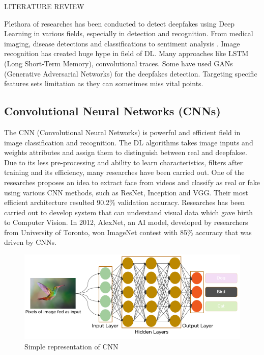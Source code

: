 \begin{section}[]{\uppercase{Literature Review}}

 Plethora of researches has been conducted to detect deepfakes using Deep Learning in various fields, especially in detection and recognition. From medical imaging, disease detections and classifications \cite{Khan2021} to sentiment analysis \cite{Alam2021}.
 Image recognition has created huge hype in field of DL. Many approaches like LSTM (Long Short-Term Memory), convolutional traces. Some have used GANs (Generative Adversarial Networks) for the deepfakes detection. \cite{Guarnera2020}
 Targeting specific features sets limitation as they can sometimes miss vital points.

 \subsection{Convolutional Neural Networks (CNNs)}
 The CNN (Convolutional Neural Networks) \cite{Saha2018} is powerful and efficient field in image classification and recognition. The DL algorithms takes image inputs and weights attributes and assign them to distinguish between real and deepfakse. Due to its less pre-processing and ability to learn characteristics, filters after training and its efficiency, many researches have been carried out.
 One of the researches \cite{Patel2020} proposes an idea to extract face from videos and classify as real or fake using various CNN methods, such as ResNet, Inception and VGG. Their most efficient architecture resulted 90.2\% validation accuracy.
 Researches has been carried out to develop system that can understand visual data which gave birth to Computer Vision. In 2012, AlexNet, an AI model, developed by researchers from University of Toronto, won ImageNet contest with 85\% accuracy that was driven by CNNs. \cite{AnalyticsVidhya2021}

    \begin{figure}[htbp]
        \centering
        \includegraphics[width=\linewidth]{images/cnn.png}
        \caption{Simple representation of CNN}
        \label{fig:cnn}
    \end{figure}


\end{section}
